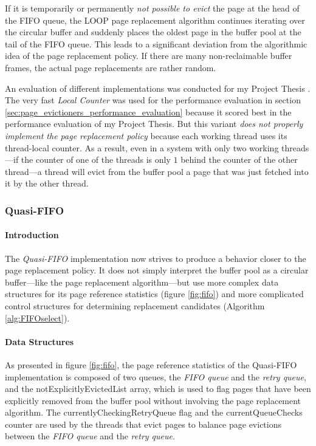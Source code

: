     If it is temporarily or permanently \emph{not possible to evict} the page at the head of the FIFO queue, the LOOP page replacement algorithm continues iterating over the circular buffer and suddenly places the oldest page in the buffer pool at the tail of the FIFO queue. This leads to a significant deviation from the algorithmic idea of the  page replacement policy. If there are many non-reclaimable buffer frames, the actual page replacements are rather random.

    An evaluation of different implementations was conducted for my Project Thesis \cite{Gilbert:2020}. The very fast \emph{Local Counter} was used for the performance evaluation in section \ref{sec:page_evictioners_performance_evaluation} because it scored best in the performance evaluation of my Project Thesis. But this variant \emph{does not properly implement the  page replacement policy} because each working thread uses its thread-local counter. As a result, even in a system with only two working threads---if the counter of one of the threads is only $1$ behind the counter of the other thread---a thread will evict from the buffer pool a page that was just fetched into it by the other thread.

\subsubsection{Quasi-FIFO} \label{subsubsec:quasi-fifo}

\paragraph{Introduction}

    The \emph{Quasi-FIFO} implementation now strives to produce a behavior closer to the  page replacement policy. It does not simply interpret the buffer pool as a circular buffer---like the  page replacement algorithm---but use more complex data structures for its page reference statistics (figure \ref{fig:fifo}) and more complicated control structures for determining replacement candidates (Algorithm \ref{alg:FIFOselect}).

\paragraph{Data Structures}

    As presented in figure \ref{fig:fifo}, the page reference statistics of the Quasi-FIFO implementation is composed of two queues, the \textit{FIFO queue} and the \textit{retry queue}, and the notExplicitlyEvictedList array, which is used to flag pages that have been explicitly removed from the buffer pool without involving the page replacement algorithm. The currentlyCheckingRetryQueue flag and the currentQueueChecks counter are used by the threads that evict pages to balance page evictions between the \textit{FIFO queue} and the \textit{retry queue}.

